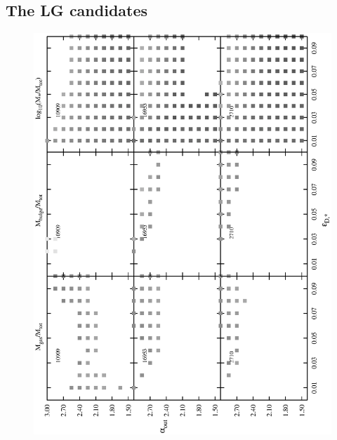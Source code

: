 \documentclass[useAMS,usenatbib]{mn2e}
\begin{document}
\subsection{The LG candidates}


\begin{figure}
  \includegraphics[scale=0.55,angle=270]{figures/hist_GasFrac_MW.ps}

\end{figure}
\end{document}
